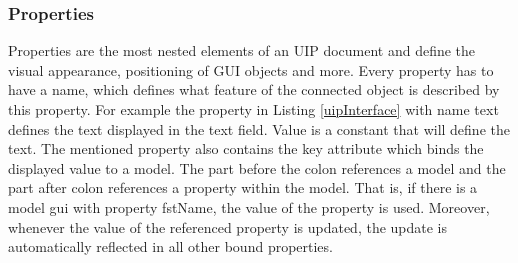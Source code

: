 \subsubsection{Properties}
Properties are the most nested elements of an UIP document and define the visual appearance, positioning of GUI objects and more. Every property has to have a name, which defines what feature of the connected object is described by this property. For example the property in Listing \ref{uipInterface} with name text defines the text displayed in the text field. Value is a constant that will define the text. The mentioned property also contains the key attribute which binds the displayed value to a model. The part before the colon references a model and the part after colon references a property within the model. That is, if there is a model gui with property fstName, the value of the property is used. Moreover, whenever the value of the referenced property is updated, the update is automatically reflected in all other bound properties.

\endinput
